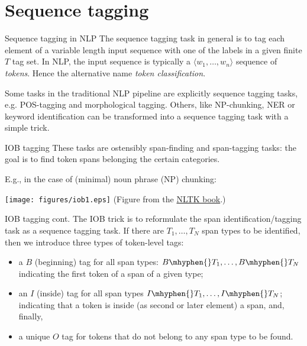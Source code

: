 \documentclass[style=upen, size=14pt]{powerdot}
\newcommand{\gold}{\color{arany}}
\theoremstyle{definition}
\begin{document}
 \section{Sequence tagging}

 \begin{slide}[toc=Tagging tasks in NLP]{Sequence tagging in NLP}
   The sequence tagging task in general is to tag each element of a variable
   length input sequence with one of the labels in a given finite $T$ tag set.
   In NLP, the input sequence is typically a $\langle w_1,\dots,w_n \rangle$
   sequence of \emph{tokens}. Hence the alternative name
   \emph{\gold token classification}.\bigskip

   Some tasks in the traditional NLP pipeline are explicitly sequence tagging
   tasks, e.g. POS-tagging and morphological tagging. Others, like NP-chunking,
   NER or keyword identification can be transformed into a sequence tagging task
   with a simple trick.
 \end{slide}

 \begin{slide}[toc=IOB tagging]{IOB tagging}
   These tasks are ostensibly span-finding and span-tagging tasks: the goal is
   to find token spans belonging the certain categories.

   E.g., in the case of (minimal) noun phrase (NP) chunking:
   \begin{center}
     \texttt{[image: figures/iob1.eps]}
   \footnotesize(Figure from the \href{http://www.nltk.org/book/ch07.html}{NLTK book}.)
 \end{center}
 \end{slide}

 \begin{slide}[toc=]{IOB tagging cont.} 
   The IOB trick is to reformulate the span identification/tagging task as a
   sequence tagging task. If there are $T_1,\dots,T_N$ span
   types to be identified, then we introduce three types of token-level tags:
   \begin{itemize}
     \item a $B$ (beginning) tag for all span types:
       $B\mhyphen{}T_1,\dots,B\mhyphen{}T_N$ indicating the first token of a
       span of a given type;
   \item an $I$ (inside) tag for all span types
       $I\mhyphen{}T_1,\dots,I\mhyphen{}T_N$; indicating that a token is inside
       (as second or later element) a span, and, finally,
   \item a unique $O$ tag for tokens that do not belong to any span type to be
     found.
   \end{itemize}
 \end{slide}
 
\end{document}
